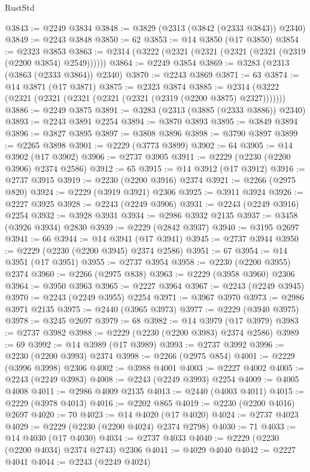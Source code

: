 \begin{lexlean}{RustStd}
\begin{coremodule}
{\begin{coremodule}
{{{{{{{{{{{{{{{{{{{{{{{{{{{{{{{{{{@3843 := @2249 @3834
@3848 := @3829 (@2313 (@3842 (@2333 @3843)) @2340)
@3849 := @2243 @3848
@3850 := 62
@3853 := @14 @3850 (@17 @3850)
@3854 := @2323 @3853
@3863 := @2314 (@3222 (@2321 (@2321 (@2321 (@2321 (@2319 (@2200 @3854) @2549))))))
@3864 := @2249 @3854
@3869 := @3283 (@2313 (@3863 (@2333 @3864)) @2340)
@3870 := @2243 @3869
@3871 := 63
@3874 := @14 @3871 (@17 @3871)
@3875 := @2323 @3874
@3885 := @2314 (@3222 (@2321 (@2321 (@2321 (@2321 (@2321 (@2319 (@2200 @3875) @2327)))))))
@3886 := @2249 @3875
@3891 := @3283 (@2313 (@3885 (@2333 @3886)) @2340)
@3893 := @2243 @3891 @2254
@3894 := @3870 @3893
@3895 := @3849 @3894
@3896 := @3827 @3895
@3897 := @3808 @3896
@3898 := @3790 @3897
@3899 := @2265 @3898
@3901 := @2229 (@3773 @3899)
@3902 := 64
@3905 := @14 @3902 (@17 @3902)
@3906 := @2737 @3905
@3911 := @2229 (@2230 (@2200 @3906) @2374 @2586)
@3912 := 65
@3915 := @14 @3912 (@17 @3912)
@3916 := @2737 @3915
@3919 := @2230 (@2200 @3916) @2374
@3921 := @2266 (@2975 @820)
@3924 := @2229 (@3919 @3921) @2306
@3925 := @3911 @3924
@3926 := @2227 @3925
@3928 := @2243 (@2249 @3906)
@3931 := @2243 (@2249 @3916) @2254
@3932 := @3928 @3931
@3934 := @2986 @3932 @2135
@3937 := @3458 (@3926 @3934) @2830
@3939 := @2229 (@2842 @3937)
@3940 := @3195 @2697
@3941 := 66
@3944 := @14 @3941 (@17 @3941)
@3945 := @2737 @3944
@3950 := @2229 (@2230 (@2200 @3945) @2374 @2586)
@3951 := 67
@3954 := @14 @3951 (@17 @3951)
@3955 := @2737 @3954
@3958 := @2230 (@2200 @3955) @2374
@3960 := @2266 (@2975 @838)
@3963 := @2229 (@3958 @3960) @2306
@3964 := @3950 @3963
@3965 := @2227 @3964
@3967 := @2243 (@2249 @3945)
@3970 := @2243 (@2249 @3955) @2254
@3971 := @3967 @3970
@3973 := @2986 @3971 @2135
@3975 := @2440 (@3965 @3973)
@3977 := @2229 (@3940 @3975)
@3978 := @3245 @2697
@3979 := 68
@3982 := @14 @3979 (@17 @3979)
@3983 := @2737 @3982
@3988 := @2229 (@2230 (@2200 @3983) @2374 @2586)
@3989 := 69
@3992 := @14 @3989 (@17 @3989)
@3993 := @2737 @3992
@3996 := @2230 (@2200 @3993) @2374
@3998 := @2266 (@2975 @854)
@4001 := @2229 (@3996 @3998) @2306
@4002 := @3988 @4001
@4003 := @2227 @4002
@4005 := @2243 (@2249 @3983)
@4008 := @2243 (@2249 @3993) @2254
@4009 := @4005 @4008
@4011 := @2986 @4009 @2135
@4013 := @2440 (@4003 @4011)
@4015 := @2229 (@3978 @4013)
@4016 := @2202 @865
@4019 := @2230 (@2200 @4016) @2697
@4020 := 70
@4023 := @14 @4020 (@17 @4020)
@4024 := @2737 @4023
@4029 := @2229 (@2230 (@2200 @4024) @2374 @2798)
@4030 := 71
@4033 := @14 @4030 (@17 @4030)
@4034 := @2737 @4033
@4040 := @2229 (@2230 (@2200 @4034) @2374 @2743) @2306
@4041 := @4029 @4040
@4042 := @2227 @4041
@4044 := @2243 (@2249 @4024)
}}}}}}}}}}}}}}}}}}}}}}}}}}}}}}}}}}
\end{coremodule}}
\end{coremodule}
\end{lexlean}
